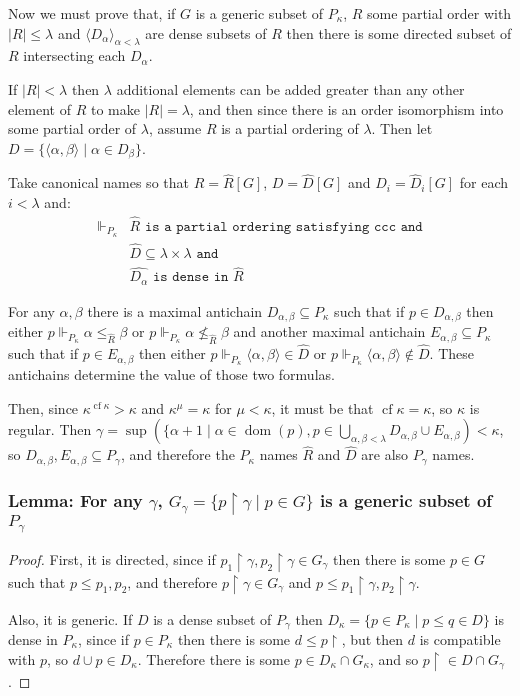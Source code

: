 \documentclass[12pt]{article}
\begin{document}
Now we must prove that, if $G$ is a generic subset of $P_\kappa$, $R$ some partial order with $|R|\leq\lambda$ and $\langle D_\alpha\rangle_{\alpha<\lambda}$ are dense subsets of $R$ then there is some directed subset of $R$ intersecting each $D_\alpha$.

If $|R|<\lambda$ then $\lambda$ additional elements can be added greater than any other element of $R$ to make $|R|=\lambda$, and then since there is an order isomorphism into some partial order of $\lambda$, assume $R$ is a partial ordering of $\lambda$.  Then let $D=\{\langle\alpha,\beta\rangle\mid\alpha\in D_\beta\}$.

Take canonical names so that $R=\hat{R}[G]$, $D=\hat{D}[G]$ and $D_i=\hat{D}_i[G]$ for each $i<\lambda$ and:
$$
\begin{array}{rl}
\Vdash_{P_\kappa}
&\hat{R}\texttt{ is a partial ordering satisfying ccc and} \\
&\hat{D}\subseteq \lambda\times\lambda\texttt{ and }\\
&\hat{D_\alpha}\texttt{ is dense in }\hat{R}
\end{array}
$$

For any $\alpha,\beta$ there is a maximal antichain $D_{\alpha,\beta}\subseteq P_\kappa$ such that if $p\in D_{\alpha,\beta}$ then either $p\Vdash_{P_\kappa} \alpha\leq_{\hat{R}}\beta$ or $p\Vdash_{P_\kappa}\alpha\nleq_{\hat{R}}\beta$ and another maximal antichain $E_{\alpha,\beta}\subseteq P_\kappa$ such that if $p\in E_{\alpha,\beta}$ then either $p\Vdash_{P_\kappa}\langle\alpha,\beta\rangle\in\hat{D}$ or $p\Vdash_{P_\kappa}\langle\alpha,\beta\rangle\not\in\hat{D}$.  These antichains determine the value of those two formulas.

Then, since $\kappa^{\operatorname{cf}\kappa}>\kappa$ and $\kappa^\mu=\kappa$ for $\mu<\kappa$, it must be that $\operatorname{cf}\kappa=\kappa$, so $\kappa$ is regular.  Then $\gamma=\operatorname{sup}(\{\alpha+1\mid \alpha\in\operatorname{dom}(p),p\in \bigcup_{\alpha,\beta<\lambda} D_{\alpha,\beta}\cup E_{\alpha,\beta})<\kappa$, so $D_{\alpha,\beta},E_{\alpha,\beta}\subseteq P_\gamma$, and therefore the $P_\kappa$ names $\hat{R}$ and $\hat{D}$ are also $P_\gamma$ names.

\subsubsection*{Lemma: For any $\gamma$, $G_\gamma=\{p\upharpoonright\gamma\mid p\in G\}$ is a generic subset of $P_\gamma$}
\begin{proof}
First, it is directed, since if $p_1\upharpoonright\gamma,p_2\upharpoonright\gamma\in G_\gamma$ then there is some $p\in G$ such that $p\leq p_1,p_2$, and therefore $p\upharpoonright\gamma\in G_\gamma$ and $p\leq p_1\upharpoonright\gamma,p_2\upharpoonright\gamma$.

Also, it is generic.  If $D$ is a dense subset of $P_\gamma$ then $D_\kappa=\{p\in P_\kappa\mid p\leq q\in D\}$ is dense in $P_\kappa$, since if $p\in P_\kappa$ then there is some $d\leq p\upharpoonright$, but then $d$ is compatible with $p$, so $d\cup p\in D_\kappa$.  Therefore there is some $p\in D_\kappa\cap G_\kappa$, and so $p\upharpoonright \in D\cap G_\gamma$.
\end{proof}
\end{document}
